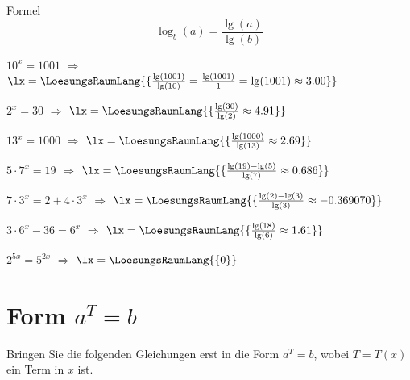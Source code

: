 Formel
$$\log_b(a) = \frac{\lg(a)}{\lg(b)}$$

\begin{bbwAufgabenBlock}

\item $10^x=1001$ $\Longrightarrow$
$\lx=\LoesungsRaumLang{\{\frac{\lg(1001)}{\lg(10)} = \frac{\lg(1001)}{1} = \lg(1001) \approx 3.00\}}$ \noTRAINER{\seitenUmbruchImAufgabenteil{}}

\item $2^x=30$ $\Longrightarrow$ $\lx=\LoesungsRaumLang{\{\frac{\lg(30)}{\lg(2)}\approx 4.91\}}$ \noTRAINER{\seitenUmbruchImAufgabenteil{}}
\item $13^x=1000$ $\Longrightarrow$ $\lx=\LoesungsRaumLang{\{\frac{\lg(1000)}{\lg(13)}\approx 2.69\}}$ 
\item $5\cdot{}7^x = 19$ $\Longrightarrow$ $\lx=\LoesungsRaumLang{\{\frac{\lg(19)-\lg(5)}{\lg(7)}\approx 0.686\}}$ \noTRAINER{\seitenUmbruchImAufgabenteil{}}
\item $7\cdot{}3^x = 2 + 4\cdot{}3^x$ $\Longrightarrow$ $\lx=\LoesungsRaumLang{\{\frac{\lg(2)-\lg(3)}{\lg(3)}\approx  -0.369070\}}$ 
\item $3\cdot{}6^x - 36 = 6^x$ $\Longrightarrow$ $\lx=\LoesungsRaumLang{\{\frac{\lg(18)}{\lg(6)} \approx  1.61 \}}$ \noTRAINER{\seitenUmbruchImAufgabenteil{}}
\item $2^{5x} = 5^{2x}$ $\Longrightarrow$ $\lx=\LoesungsRaumLang{\{0\}}$ 
\end{bbwAufgabenBlock}

\newpage

\section{Form $a^{T} = b$}
Bringen Sie die folgenden Gleichungen erst in die Form $a^T=b$, wobei
$T=T(x)$ ein Term in $x$ ist.


